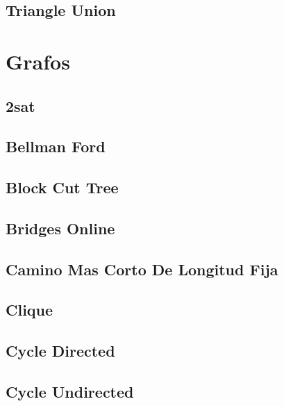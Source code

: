 \subsection{Triangle Union}
\raggedbottom
\hrulefill

\section{Grafos}
\subsection{2sat}
\raggedbottom
\hrulefill
\subsection{Bellman Ford}
\raggedbottom
\hrulefill
\subsection{Block Cut Tree}
\raggedbottom
\hrulefill
\subsection{Bridges Online}
\raggedbottom
\hrulefill
\subsection{Camino Mas Corto De Longitud Fija}
\raggedbottom
\hrulefill
\subsection{Clique}
\raggedbottom
\hrulefill
\subsection{Cycle Directed}
\raggedbottom
\hrulefill
\subsection{Cycle Undirected}
\raggedbottom
\hrulefill
